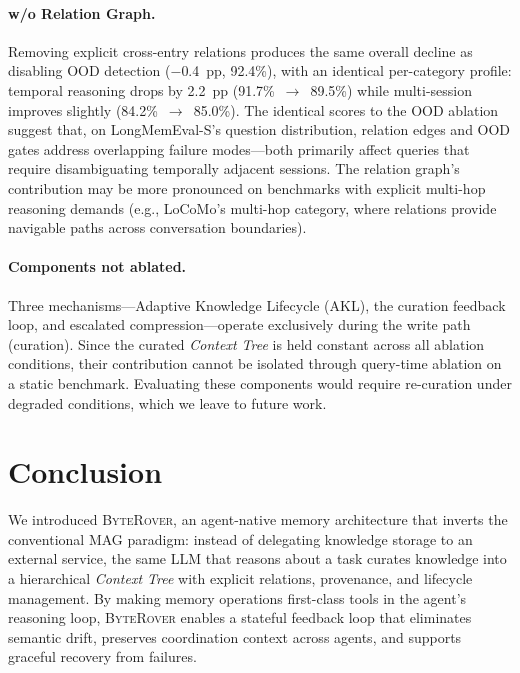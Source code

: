 \documentclass[11pt]{article}
\newcommand{\byterover}{\textsc{ByteRover}}
\newcommand{\contexttree}{\textit{Context Tree}}
\begin{document}
\paragraph{w/o Relation Graph.}
Removing explicit cross-entry relations produces the same
overall decline as disabling OOD detection ($-$0.4~pp, 92.4\%),
with an identical per-category profile:
temporal reasoning drops by 2.2~pp (91.7\%~$\to$~89.5\%)
while multi-session improves slightly (84.2\%~$\to$~85.0\%).
The identical scores to the OOD ablation suggest that,
on LongMemEval-S's question distribution,
relation edges and OOD gates address overlapping failure modes---both
primarily affect queries that require disambiguating
temporally adjacent sessions.
The relation graph's contribution may be more pronounced
on benchmarks with explicit multi-hop reasoning demands
(e.g., LoCoMo's multi-hop category, where relations
provide navigable paths across conversation boundaries).

\paragraph{Components not ablated.}
Three mechanisms---Adaptive Knowledge Lifecycle (AKL), the curation feedback loop,
and escalated compression---operate exclusively during the write path (curation).
Since the curated \contexttree{} is held constant across all ablation conditions,
their contribution cannot be isolated through query-time ablation on a static benchmark.
Evaluating these components would require re-curation under degraded conditions,
which we leave to future work.


\section{Conclusion}
\label{sec:conclusion}

We introduced \byterover{}, an agent-native memory architecture that inverts
the conventional MAG paradigm: instead of delegating knowledge storage to an external service,
the same LLM that reasons about a task curates knowledge into a hierarchical \contexttree{}
with explicit relations, provenance, and lifecycle management.
By making memory operations first-class tools in the agent's reasoning loop,
\byterover{} enables a stateful feedback loop that eliminates semantic drift,
preserves coordination context across agents, and supports graceful recovery from failures.
\end{document}
